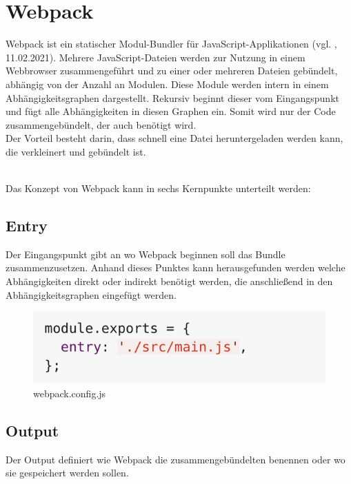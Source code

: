 \section{Webpack}
Webpack ist ein statischer Modul-Bundler für JavaScript-Applikationen (vgl. \cite{webpack_2021}, 11.02.2021). Mehrere JavaScript-Dateien werden zur Nutzung in einem Webbrowser zusammengeführt und zu einer oder mehreren Dateien gebündelt, abhängig von der Anzahl an Modulen. Diese Module werden intern in einem Abhängigkeitsgraphen dargestellt. Rekursiv beginnt dieser vom Eingangspunkt und fügt alle Abhängigkeiten in diesen Graphen ein. Somit wird nur der Code zusammengebündelt, der auch benötigt wird. \\
Der Vorteil besteht darin, dass schnell eine Datei heruntergeladen werden kann, die verkleinert und gebündelt ist. 

\mbox{}\\
Das Konzept von Webpack kann in sechs Kernpunkte unterteilt werden:

\subsection{Entry}
Der Eingangspunkt gibt an wo Webpack beginnen soll das Bundle zusammenzusetzen. Anhand dieses Punktes kann herausgefunden werden welche Abhängigkeiten direkt oder indirekt benötigt werden, die anschließend in den Abhängigkeitsgraphen eingefügt werden. 

\begin{figure}[H]
	\begin{center}
		\includegraphics[scale=.7]{images/webpack-entry-point.png}
	\end{center}
		\caption{webpack.config.js}
\end{figure}

\subsection{Output}
Der Output definiert wie Webpack die zusammengebündelten benennen oder wo sie gespeichert werden sollen. 

